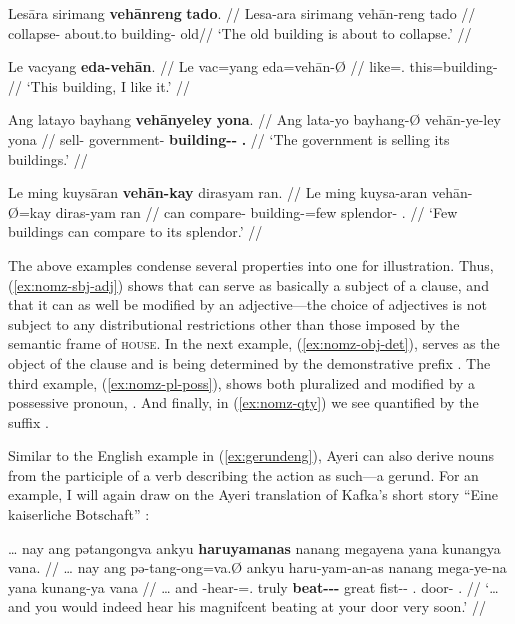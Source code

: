 \pex
\a\label{ex:nomz-sbj-adj}\begingl
	\gla Lesāra sirimang \textbf{vehānreng} \textbf{tado}. //
	\glb Lesa-ara sirimang vehān-reng tado //
	\glc collapse-\TsgI{} about.to building-\AargI{} old//
	\glft `The old building is about to collapse.' //
\endgl

\a\label{ex:nomz-obj-det}\begingl
	\gla Le vacyang \textbf{eda-vehān}. //
	\glb Le vac=yang eda=vehān-Ø //
	\glc \PatTI{} like=\Fsg{}.\Aarg{} this=building-\Top{} //
	\glft `This building, I like it.' //
\endgl

\a\label{ex:nomz-pl-poss}\begingl
	\gla Ang latayo bayhang \textbf{vehānyeley} \textbf{yona}. //
	\glb Ang lata-yo bayhang-Ø vehān-ye-ley yona //
	\glc \AgtT{} sell-\TsgN{} government-\Top{} 
		\textbf{building-\Pl{}-\PargI{}} \textbf{\TsgN{}.\Gen{}} //
	\glft `The government is selling its buildings.' //
\endgl

\a\label{ex:nomz-qty}\begingl
	\gla Le ming kuysāran \textbf{vehān-kay} dirasyam ran. //
	\glb Le ming kuysa-aran vehān-Ø=kay diras-yam ran //
	\glc \PatTI{} can compare-\TplI{} building-\Top=few 
		splendor-\Dat{} \TsgI{}.\Gen{} //
	\glft `Few buildings can compare to its splendor.' //
\endgl
\xe

The above examples condense several properties into one for illustration. Thus, 
(\ref{ex:nomz-sbj-adj}) shows that  can serve as basically 
a subject of a clause, and that it can as well be modified by an 
adjective---the choice of adjectives is not subject to any distributional 
restrictions other than those imposed by the semantic frame of 
\textsc{house}. In the next example, (\ref{ex:nomz-obj-det}), 
 serves as the object of the clause and is being 
determined by the demonstrative prefix . The third 
example, (\ref{ex:nomz-pl-poss}), shows  both pluralized 
and modified by a possessive pronoun, . And finally, in 
(\ref{ex:nomz-qty}) we see  quantified by the suffix 
.

Similar to the English example in (\ref{ex:gerundeng}), Ayeri can also derive 
nouns from the participle of a verb describing the action as such---a gerund. 
For an example, I will again draw on the Ayeri translation of Kafka's short 
story \enquote{Eine kaiserliche Botschaft} \citep[2, 14]{becker:kafka:imperial}:

\ex\label{ex:kafkagerund}\begingl
	\gla … nay ang pətangongva ankyu \textbf{haruyamanas} nanang megayena 
		yana kunangya vana. //
	\glb … nay ang pə-tang-ong=va.Ø ankyu haru-yam-an-as nanang 
		mega-ye-na yana kunang-ya vana //
	\glc … and \AgtT{} \NFut{}-hear-\Irr{}=\Ssg{}.\Top{} truly 
		\textbf{beat-\Ptcp{}-\Nmlz{}-\Parg{}} great fist-\Pl{}-\Gen{} 
		\TsgM{}.\Gen{} door-\Loc{} \Ssg{}.\Gen{} //
	\glft `… and you would indeed hear his magnifcent beating at your door 
		very soon.' //
\endgl\xe

